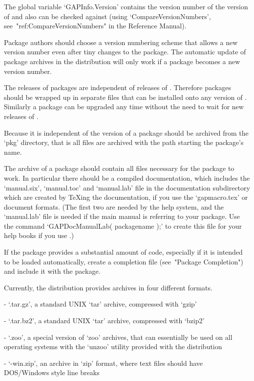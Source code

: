 The global  variable `GAPInfo.Version' contains the  version number of
the  version  of  {\GAP}  and  also  can  be  checked  against  (using
`CompareVersionNumbers', see~"ref:CompareVersionNumbers" in the {\GAP}
Reference Manual).

Package authors should choose a version numbering scheme that allows a
new  version  number even  after  tiny  changes  to the  package.  The
automatic update of  package archives in the  {\GAP} distribution will
only work if a package becomes a new version number.


The releases of {\GAP} packages are independent of releases of {\GAP}.
Therefore {\GAP} packages should be wrapped up in separate files that can be
installed onto any version of {\GAP}. Similarly a {\GAP} package can be
upgraded any time without the need to wait for new releases of {\GAP}.

Because it is independent of the version of {\GAP} a {\GAP} package should be
archived from the {\GAP} `pkg'  directory, that is all files are archived with
the path starting the package's name.

The archive of  a {\GAP} package should contain all  files necessary for the
package to  work. In  particular there should  be a  compiled documentation,
which includes the  `manual.six', `manual.toc' and `manual.lab'  file in the
documentation subdirectory which are created by {\TeX}ing the documentation,
if you  use the  `gapmacro.tex' or   document  formats. (The
first two are needed by the {\GAP} help system, and the `manual.lab' file is
needed if  the main  manual is  referring to your  package. Use  the command
`GAPDocManualLab( packagename );' to create this file for your help books if
you use .)

If the  package provides a substantial  amount of code, especially  if it is
intended to be loaded automatically,  create a completion file (see~"Package
Completion") and include it with the package.

Currently, the {\GAP} distribution provides archives in four different
formats.
\beginlist
\item{-} `.tar.gz', a standard UNIX  `tar' archive, compressed with `gzip'
\item{-} `.tar.bz2', a standard UNIX  `tar' archive, compressed with `bzip2'
\item{-} `.zoo', a special version of `zoo' archives, that can essentially
be used on all operating systems with the `unzoo' utility provided with
the {\GAP} distribution
\item{-} `-win.zip', an archive in `zip' format, where text files should
have DOS/Windows style line breaks
\endlist

